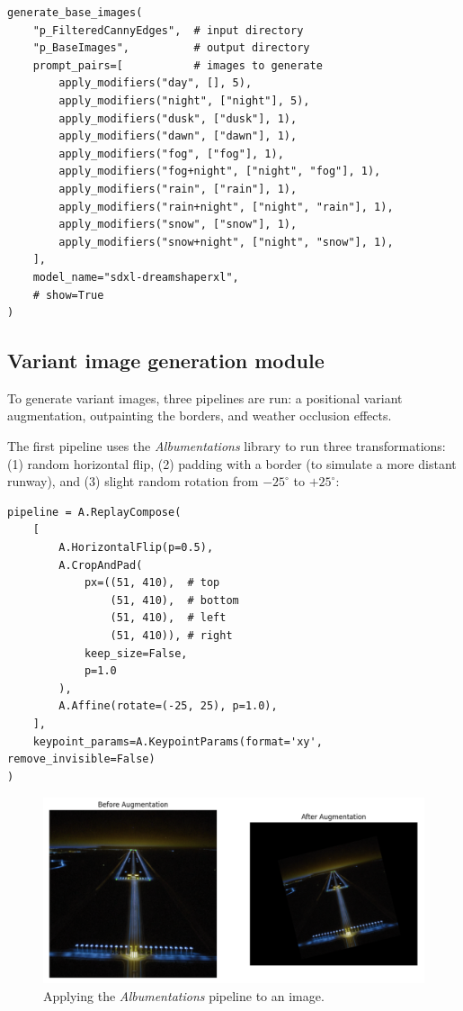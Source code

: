 \begin{lstlisting}
generate_base_images(
    "p_FilteredCannyEdges",  # input directory
    "p_BaseImages",          # output directory
    prompt_pairs=[           # images to generate
        apply_modifiers("day", [], 5),
        apply_modifiers("night", ["night"], 5),
        apply_modifiers("dusk", ["dusk"], 1),
        apply_modifiers("dawn", ["dawn"], 1),
        apply_modifiers("fog", ["fog"], 1),
        apply_modifiers("fog+night", ["night", "fog"], 1),
        apply_modifiers("rain", ["rain"], 1),
        apply_modifiers("rain+night", ["night", "rain"], 1),
        apply_modifiers("snow", ["snow"], 1),
        apply_modifiers("snow+night", ["night", "snow"], 1),
    ],
    model_name="sdxl-dreamshaperxl",
    # show=True
)
\end{lstlisting}

\subsection{Variant image generation module}

To generate variant images, three pipelines are run: a positional variant augmentation, outpainting the borders, and weather occlusion effects.

The first pipeline uses the \emph{Albumentations} library \cite{buslaev_albumentations_2020} to run three transformations: 
(1) random horizontal flip, 
(2) padding with a border (to simulate a more distant runway), and 
(3) slight random rotation from $-25^\circ$ to $+25^\circ$:

\begin{lstlisting}
pipeline = A.ReplayCompose(
    [
        A.HorizontalFlip(p=0.5),
        A.CropAndPad(
            px=((51, 410),  # top
                (51, 410),  # bottom
                (51, 410),  # left
                (51, 410)), # right
            keep_size=False,
            p=1.0
        ),
        A.Affine(rotate=(-25, 25), p=1.0),
    ],
    keypoint_params=A.KeypointParams(format='xy', remove_invisible=False)
)
\end{lstlisting}

\begin{figure}[htbp]
\centering
\includegraphics[width=1.0\textwidth]{figures/albumentations.png}
  \caption{Applying the \emph{Albumentations} pipeline to an image.}
\label{fig:noise_to_image}
\end{figure}


